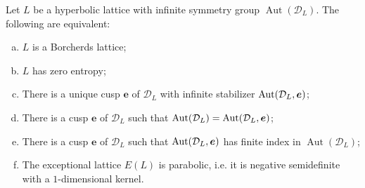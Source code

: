 \documentclass[11pt,letterpaper]{amsart}
\newcommand{\vect}[1]{\boldsymbol{#1}}
\DeclareMathOperator{\Aut}{Aut}
\begin{document}
\begin{theorem} \label{thm:equivalence.characterizations.Borcherds}
Let $L$ be a hyperbolic lattice with infinite symmetry group $\Aut(\mathcal{D}_L)$. The following are equivalent:
\begin{enumerate}[(a)]
    \item $L$ is a Borcherds lattice;
    \item $L$ has zero entropy;
    \item There is a unique cusp $\vect{e}$ of $\mathcal{D}_L$ with infinite stabilizer $\Stabe$;
    \item There is a cusp $\vect{e}$ of $\mathcal{D}_L$ such that $\Aut(\mathcal{D}_L)=\Stabe$;
    \item There is a cusp $\vect{e}$ of $\mathcal{D}_L$ such that $\Stabe$ has finite index in $\Aut(\mathcal{D}_L)$;
    \item The exceptional lattice $E(L)$ is parabolic, i.e. it is negative semidefinite with a $1$-dimensional kernel.
\end{enumerate}
\end{theorem}
\end{document}
